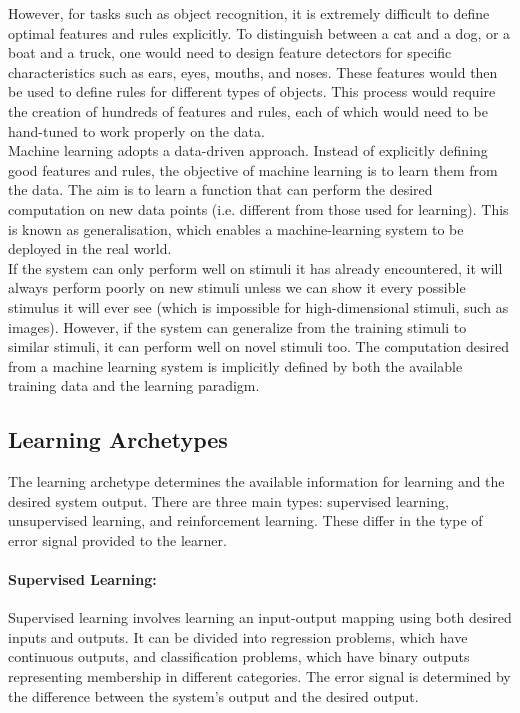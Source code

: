 \noindent However, for tasks such as object recognition, it is extremely difficult to define optimal features and rules explicitly. To distinguish between a cat and a dog, or a boat and a truck, one would need to design feature detectors for specific characteristics such as ears, eyes, mouths, and noses. These features would then be used to define rules for different types of objects. This process would require the creation of hundreds of features and rules, each of which would need to be hand-tuned to work properly on the data.  \\

\noindent Machine learning adopts a data-driven approach. Instead of explicitly defining good features and rules, the objective of machine learning is to learn them from the data. The aim is to learn a function that can perform the desired computation on new data points (i.e. different from those used for learning). This is known as generalisation, which enables a machine-learning system to be deployed in the real world. \\

\noindent If the system can only perform well on stimuli it has already encountered, it will always perform poorly on new stimuli unless we can show it every possible stimulus it will ever see (which is impossible for high-dimensional stimuli, such as images). However, if the system can generalize from the training stimuli to similar stimuli, it can perform well on novel stimuli too. The computation desired from a machine learning system is implicitly defined by both the available training data and the learning paradigm. 

\subsection[Learning Archetypes]{Learning Archetypes}

The learning archetype determines the available information for learning and the desired system output. There are three main types: supervised learning, unsupervised learning, and reinforcement learning. These differ in the type of error signal provided to the learner. 

\paragraph{Supervised Learning:} Supervised learning involves learning an input-output mapping using both desired inputs and outputs. It can be divided into regression problems, which have continuous outputs, and classification problems, which have binary outputs representing membership in different categories. The error signal is determined by the difference between the system's output and the desired output.

